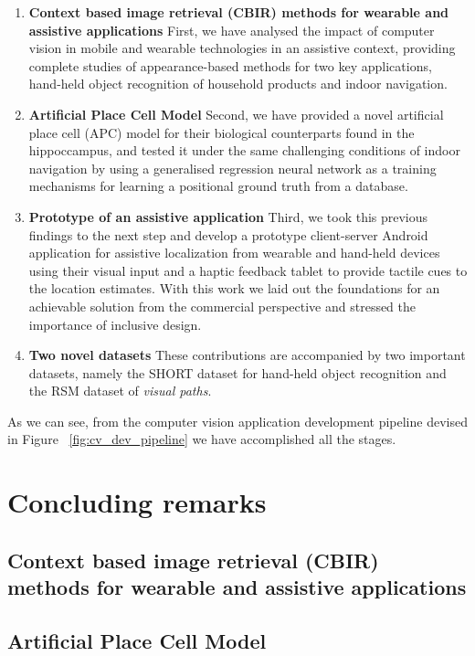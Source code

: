 \begin{enumerate}
\item \textbf{Context based image retrieval (CBIR) methods for wearable and assistive applications} First, we have analysed the impact of computer vision in mobile and wearable technologies in an assistive context, providing complete studies of appearance-based methods for two key applications, hand-held object recognition of household products and indoor navigation.

\item \textbf{Artificial Place Cell Model} Second, we have provided a novel artificial place cell (APC) model for their biological counterparts found in the hippoccampus, and tested it under the same challenging conditions of indoor navigation by using a generalised regression neural network as a training mechanisms for learning a positional ground truth from a database.

\item \textbf{Prototype of an assistive application} Third, we took this previous findings to the next step and develop a prototype client-server Android application for assistive localization from wearable and hand-held devices using their visual input and a haptic feedback tablet to provide tactile cues to the location estimates. With this work we laid out the foundations for an achievable solution from the commercial perspective and stressed the importance of inclusive design.


\item \textbf{Two novel datasets} These contributions are accompanied by two important datasets, namely the SHORT dataset for hand-held object recognition and the RSM dataset of \emph{visual paths}.
\end{enumerate}

As we can see, from the computer vision application development pipeline devised in Figure ~\ref{fig:cv_dev_pipeline} we have accomplished all the stages.

\section{Concluding remarks}

\subsection{Context based image retrieval (CBIR) methods for wearable and assistive applications}

\subsection{Artificial Place Cell Model}

